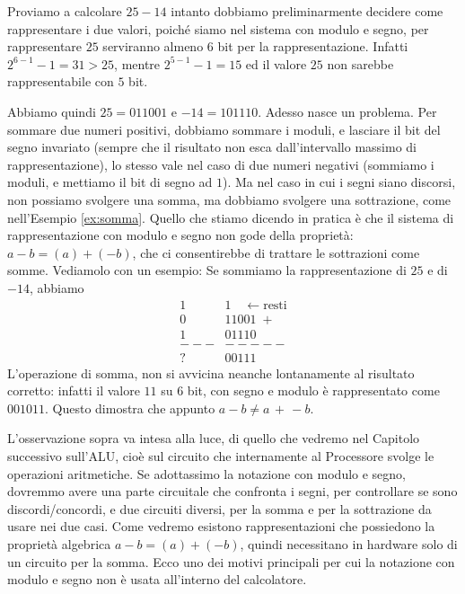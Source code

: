 \begin{ex} Proviamo a calcolare $25 - 14$ intanto dobbiamo preliminarmente decidere come rappresentare i due valori, poiché siamo nel sistema con modulo e segno, per rappresentare $25$ serviranno almeno $6$ bit per la rappresentazione. Infatti $2^{6-1}-1 = 31 > 25$, mentre $2^{5-1}-1 = 15$ ed il valore $25$ non sarebbe rappresentabile con $5$ bit.

Abbiamo quindi $25 = 011001$ e  $-14 = 101110$. Adesso nasce un problema.
Per sommare due numeri positivi, dobbiamo sommare i moduli, e lasciare il bit
del segno invariato (sempre che il risultato non esca dall'intervallo massimo
di rappresentazione), lo stesso vale nel caso di due numeri negativi (sommiamo
i moduli, e mettiamo il bit di segno ad $1$). Ma nel caso in cui i segni siano
discorsi, non possiamo svolgere una somma, ma dobbiamo svolgere una sottrazione,
come nell'Esempio \ref{ex:somma}. Quello che stiamo dicendo in pratica è che
il sistema di rappresentazione con modulo e segno non gode della proprietà: $a-b = (a)+(-b)$, che ci consentirebbe di trattare le sottrazioni come somme. Vediamolo con un esempio:
Se sommiamo la rappresentazione di $25$ e di $-14$, abbiamo
\begin{align*}
	    1&1 \quad \leftarrow\text{resti}\\
	    0&11001 \;+\\
	    1&01110\\
      ---&-----\\
	    ?&00111
\end{align*} L'operazione di somma, non si avvicina neanche lontanamente
al risultato corretto: infatti il valore $11$ su $6$ bit, con segno e modulo è rappresentato come $001011$. Questo dimostra che appunto $a-b \neq a \,+\, -b$.
\end{ex}

L'osservazione sopra va intesa alla luce, di quello che vedremo nel Capitolo successivo sull'ALU, cioè sul circuito che internamente al Processore svolge le
operazioni aritmetiche. Se adottassimo la notazione con modulo e segno, dovremmo avere una parte circuitale che confronta i segni, per controllare se
sono discordi/concordi, e due circuiti diversi, per la somma e per la sottrazione da usare nei due casi. Come vedremo esistono
rappresentazioni che possiedono la proprietà algebrica $a-b = (a)+(-b)$,
quindi necessitano in hardware solo di un circuito per la somma. Ecco
uno dei motivi principali per cui la notazione con modulo e segno non è usata all'interno del calcolatore.

